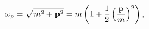 \begin{equation}
\omega _{p}=\sqrt{m^{2}+\mathbf{p}^{2}}=m\left( 1+\frac{1}{2}\left( \frac{%
\mathbf{p}}{m}\right) ^{2}\right) ,
\end{equation}

